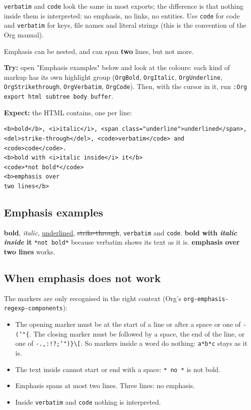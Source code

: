 \texttt{verbatim} and \texttt{code} look the same in most exports; the difference is
that nothing inside them is interpreted: no emphasis, no links, no
entities. Use \texttt{code} for code and \texttt{verbatim} for keys, file names and
literal strings (this is the convention of the Org manual).

Emphasis can be nested, and can span \textbf{two} lines, but not more.

\textbf{Try:} open "Emphasis examples" below and look at the colours: each kind of
markup has its own highlight group (\texttt{OrgBold}, \texttt{OrgItalic}, \texttt{OrgUnderline},
\texttt{OrgStrikethrough}, \texttt{OrgVerbatim}, \texttt{OrgCode}). Then, with the cursor in it,
run \texttt{:Org export html subtree body buffer}.

\textbf{Expect:} the HTML contains, one per line:
\begin{verbatim}
<b>bold</b>, <i>italic</i>, <span class="underline">underlined</span>,
<del>strike-through</del>, <code>verbatim</code> and <code>code</code>.
<b>bold with <i>italic inside</i> it</b>
<code>*not bold*</code>
<b>emphasis over
two lines</b>
\end{verbatim}
\subsection{Emphasis examples}
\label{sec:org2dc5823}
\textbf{bold}, \emph{italic}, \uline{underlined},
\sout{strike-through}, \texttt{verbatim} and \texttt{code}.
\textbf{bold with \emph{italic inside} it}
\texttt{*not bold*} because verbatim shows its text as it is.
\textbf{emphasis over
two lines} works.
\subsection{When emphasis does not work}
\label{sec:orgeab1bb9}
The markers are only recognised in the right context (Org's
\texttt{org-emphasis-regexp-components}):

\begin{itemize}
\item The opening marker must be at the start of a line or after a space or one
of \texttt{-('"\{}. The closing marker must be followed by a space, the end of the
line, or one of \texttt{-.,:!?;'")\}\textbackslash{}[}. So markers inside a word do nothing:
\texttt{a*b*c} stays as it is.
\item The text inside cannot start or end with a space: \texttt{* no *} is not bold.
\item Emphasis spans at most two lines. Three lines: no emphasis.
\item Inside \texttt{verbatim} and \texttt{code} nothing is interpreted.
\end{itemize}

